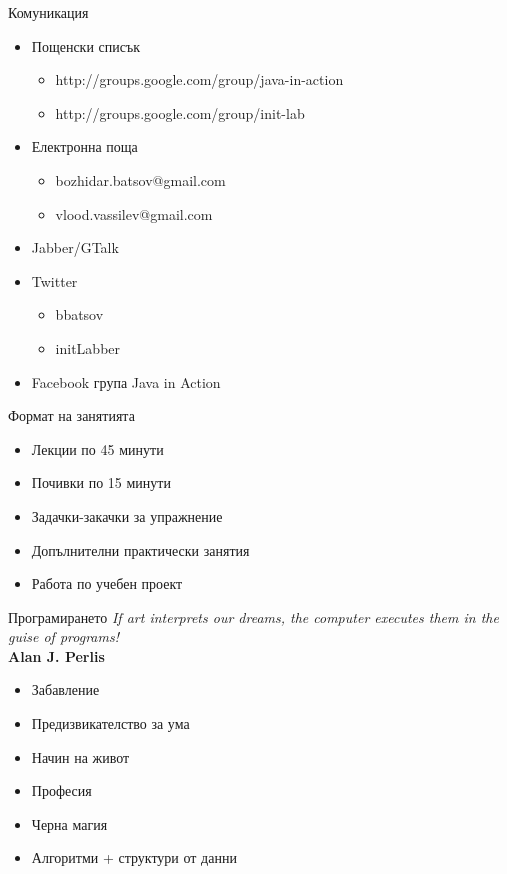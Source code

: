 \documentclass{beamer}
\begin{document}
\begin{frame}{Комуникация}
  \transdissolve
  \begin{itemize}
  \item Пощенски списък 
    \begin{itemize}
    \item http://groups.google.com/group/java-in-action
    \item http://groups.google.com/group/init-lab
    \end{itemize}
    \pause
  \item Електронна поща
    \begin{itemize}
      \item bozhidar.batsov@gmail.com
      \item vlood.vassilev@gmail.com
    \end{itemize}
    \pause
  \item Jabber/GTalk
    \pause
  \item Twitter
    \begin{itemize}
      \item bbatsov
      \item initLabber
    \end{itemize}
    \pause
  \item Facebook група Java in Action
  \end{itemize}
\end{frame}

\begin{frame}{Формат на занятията}
  \transdissolve
  \begin{itemize}
  \item Лекции по 45 минути
  \item Почивки по 15 минути
  \item Задачки-закачки за упражнение
  \item Допълнителни практически занятия
  \item Работа по учебен проект
  \end{itemize}
\end{frame}

\begin{frame}{Програмирането}
  \transdissolve
  \textit{If art interprets our dreams, the computer executes them in the
  guise of programs!} \\
  \hskip 8cm \textbf{Alan J. Perlis}
  \pause
  \begin{itemize}
  \item Забавление \pause
  \item Предизвикателство за ума \pause
  \item Начин на живот \pause
  \item Професия \pause
  \item Черна магия \pause
  \item Алгоритми + структури от данни \pause
  \end{itemize}
\end{frame}
\end{document}
